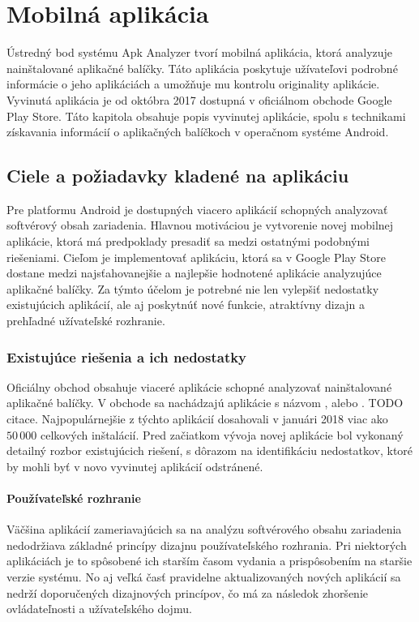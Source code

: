 \chapter{Mobilná aplikácia}
\label{chap:mobilna-aplikacia}

Ústredný bod systému Apk Analyzer tvorí mobilná aplikácia, ktorá analyzuje nainštalované aplikačné balíčky. Táto aplikácia poskytuje užívateľovi podrobné informácie o jeho aplikáciách a umožňuje mu kontrolu originality aplikácie. Vyvinutá aplikácia je od októbra 2017 dostupná v oficiálnom obchode Google Play Store. Táto kapitola obsahuje popis vyvinutej aplikácie, spolu s technikami získavania informácií o aplikačných balíčkoch v operačnom systéme Android.

\section{Ciele a požiadavky kladené na aplikáciu}
Pre platformu Android je dostupných viacero aplikácií schopných analyzovať softvérový obsah zariadenia. Hlavnou motiváciou je vytvorenie novej mobilnej aplikácie, ktorá má predpoklady presadiť sa medzi ostatnými podobnými riešeniami. Cieľom je implementovať aplikáciu, ktorá sa v Google Play Store dostane medzi najsťahovanejšie a najlepšie hodnotené aplikácie analyzujúce aplikačné balíčky. Za týmto účelom je potrebné nie len vylepšiť nedostatky existujúcich aplikácií, ale aj poskytnúť nové funkcie, atraktívny dizajn a prehľadné užívateľské rozhranie. 

\subsection{Existujúce riešenia a ich nedostatky}
Oficiálny obchod  obsahuje viaceré aplikácie schopné analyzovať nainštalované aplikačné balíčky. V obchode sa nachádzajú aplikácie s názvom ,  alebo . TODO citace. Najpopulárnejšie z týchto aplikácií dosahovali v januári 2018 viac ako $50\,000$ celkových inštalácií. Pred začiatkom vývoja novej aplikácie bol vykonaný detailný rozbor existujúcich riešení, s dôrazom na identifikáciu nedostatkov, ktoré by mohli byť v novo vyvinutej aplikácií odstránené.
\subsubsection{\textbf{Používateľské rozhranie}}
Väčšina aplikácií zameriavajúcich sa na analýzu softvérového obsahu zariadenia nedodržiava základné princípy dizajnu používateľského rozhrania. Pri niektorých aplikáciách je to spôsobené ich starším časom vydania a prispôsobením na staršie verzie systému. No aj veľká časť pravidelne aktualizovaných nových aplikácií sa nedrží doporučených dizajnových princípov, čo má za následok zhoršenie ovládateľnosti a užívateľského dojmu.

